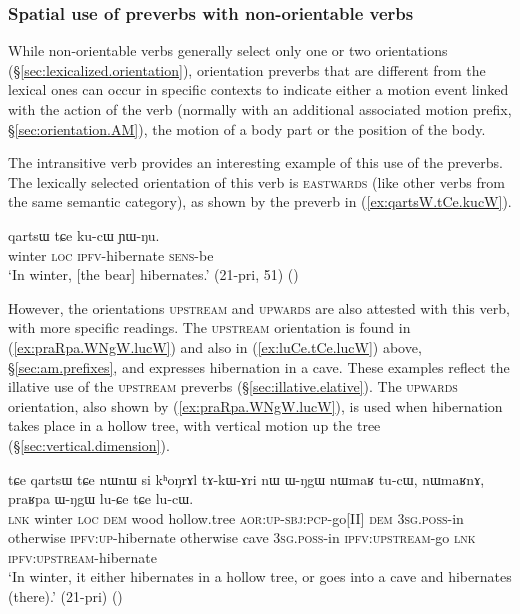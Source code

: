 \subsubsection{Spatial use of preverbs with non-orientable verbs} \label{sec:orientation.position}
While non-orientable verbs generally select only one or two orientations (§\ref{sec:lexicalized.orientation}), orientation preverbs that are different from the lexical ones can occur in specific contexts to indicate either a motion event linked with the action of the verb (normally with an additional associated motion prefix, §\ref{sec:orientation.AM}), the motion of a body part or the position of the body. 

The intransitive verb  provides an interesting example of this use of the preverbs. The lexically selected orientation of this verb is \textsc{eastwards} (like other verbs from the same semantic category), as shown by the preverb  in (\ref{ex:qartsW.tCe.kucW}).

\begin{exe}
\ex \label{ex:qartsW.tCe.kucW}
\gll  qartsɯ tɕe ku-cɯ ɲɯ-ŋu. \\
winter \textsc{loc} \textsc{ipfv}-hibernate \textsc{sens}-be \\
\glt `In winter, [the bear] hibernates.' (21-pri, 51) ()
\end{exe}

However, the orientations \textsc{upstream} and \textsc{upwards} are also attested with this verb, with more specific readings. The \textsc{upstream} orientation is found in (\ref{ex:praRpa.WNgW.lucW}) and also in (\ref{ex:luCe.tCe.lucW}) above, §\ref{sec:am.prefixes}, and expresses hibernation in a cave. These examples reflect the illative use of the \textsc{upstream} preverbs (§\ref{sec:illative.elative}). The \textsc{upwards} orientation, also shown by (\ref{ex:praRpa.WNgW.lucW}), is used when hibernation takes place in a hollow tree, with vertical motion up the tree (§\ref{sec:vertical.dimension}).

\begin{exe}
\ex \label{ex:praRpa.WNgW.lucW}
\gll tɕe qartsɯ tɕe nɯnɯ si kʰoŋrɤl tɤ-kɯ-ɤri nɯ ɯ-ŋgɯ nɯmaʁ tu-cɯ, 
nɯmaʁnɤ, praʁpa ɯ-ŋgɯ lu-ɕe tɕe lu-cɯ. \\
\textsc{lnk} winter \textsc{loc} \textsc{dem} wood hollow.tree \textsc{aor}:\textsc{up}-\textsc{sbj}:\textsc{pcp}-go[II] \textsc{dem} \textsc{3sg}.\textsc{poss}-in otherwise \textsc{ipfv}:\textsc{up}-hibernate otherwise cave \textsc{3sg}.\textsc{poss}-in \textsc{ipfv}:\textsc{upstream}-go \textsc{lnk} \textsc{ipfv}:\textsc{upstream}-hibernate \\
\glt `In winter, it either hibernates in a hollow tree, or goes into a cave and hibernates (there).' (21-pri)
()
\end{exe}

